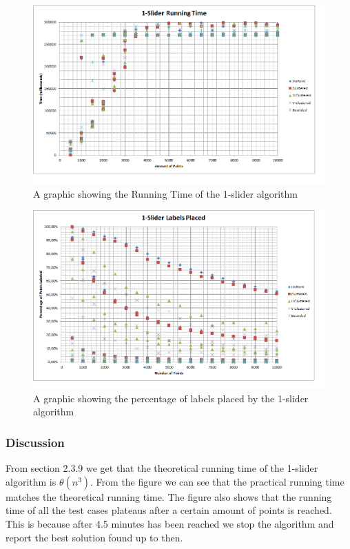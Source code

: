 \documentclass[crop=false,a4paper,oneside,11pt]{standalone}
\begin{document}
 \begin{figure}[h!]
 \centering
 \centerline{\includegraphics[scale = 0.65]{1slider.png}}
 \caption{A graphic showing the Running Time of the 1-slider algorithm}
 \end{figure}

 \begin{figure}[h!]
 \centering
  \centerline{\includegraphics[scale = 0.65]{1sliderplaced.png}}
  \caption{A graphic showing the percentage of labels placed by the 1-slider algorithm}
 \end{figure}
 
\subsubsection{Discussion}
From section 2.3.9 we get that the theoretical running time of the 1-slider algorithm is $\theta(n^3)$. From the figure we can see that the practical running time matches the theoretical running time. The figure also shows that the running time of all the test cases plateaus after a certain amount of points is reached. This is because after 4.5 minutes has been reached we stop the algorithm and report the best solution found up to then.
\end{document}
